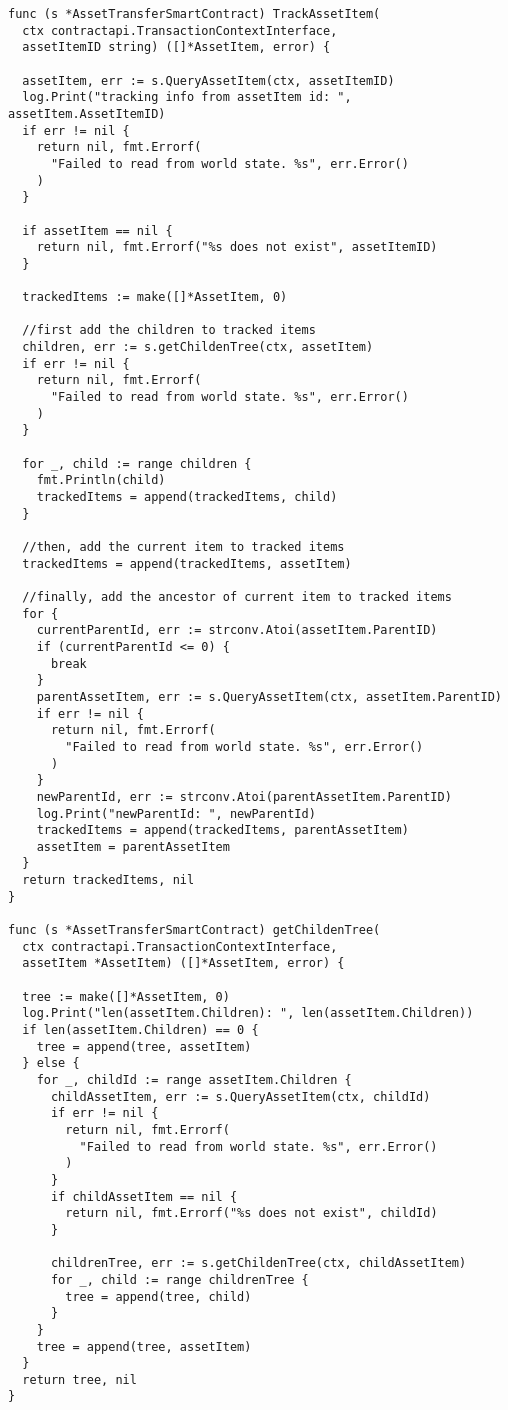 \begin{verbatim}
func (s *AssetTransferSmartContract) TrackAssetItem(
  ctx contractapi.TransactionContextInterface, 
  assetItemID string) ([]*AssetItem, error) {
  
  assetItem, err := s.QueryAssetItem(ctx, assetItemID)
  log.Print("tracking info from assetItem id: ", assetItem.AssetItemID)
  if err != nil {
    return nil, fmt.Errorf(
      "Failed to read from world state. %s", err.Error()
    )
  }

  if assetItem == nil {
    return nil, fmt.Errorf("%s does not exist", assetItemID)
  }

  trackedItems := make([]*AssetItem, 0)

  //first add the children to tracked items
  children, err := s.getChildenTree(ctx, assetItem)
  if err != nil {
    return nil, fmt.Errorf(
      "Failed to read from world state. %s", err.Error()
    )
  }

  for _, child := range children {
    fmt.Println(child)
    trackedItems = append(trackedItems, child)
  }

  //then, add the current item to tracked items
  trackedItems = append(trackedItems, assetItem)

  //finally, add the ancestor of current item to tracked items
  for {
    currentParentId, err := strconv.Atoi(assetItem.ParentID)
    if (currentParentId <= 0) {
      break
    }
    parentAssetItem, err := s.QueryAssetItem(ctx, assetItem.ParentID)
    if err != nil {
      return nil, fmt.Errorf(
        "Failed to read from world state. %s", err.Error()
      )
    }
    newParentId, err := strconv.Atoi(parentAssetItem.ParentID)
    log.Print("newParentId: ", newParentId)
    trackedItems = append(trackedItems, parentAssetItem)
    assetItem = parentAssetItem
  }
  return trackedItems, nil
}

func (s *AssetTransferSmartContract) getChildenTree(
  ctx contractapi.TransactionContextInterface, 
  assetItem *AssetItem) ([]*AssetItem, error) {
  
  tree := make([]*AssetItem, 0)
  log.Print("len(assetItem.Children): ", len(assetItem.Children))
  if len(assetItem.Children) == 0 {
    tree = append(tree, assetItem)
  } else {
    for _, childId := range assetItem.Children {
      childAssetItem, err := s.QueryAssetItem(ctx, childId)
      if err != nil {
        return nil, fmt.Errorf(
          "Failed to read from world state. %s", err.Error()
        )
      }
      if childAssetItem == nil {
        return nil, fmt.Errorf("%s does not exist", childId)
      }

      childrenTree, err := s.getChildenTree(ctx, childAssetItem)
      for _, child := range childrenTree {
        tree = append(tree, child)
      }
    }
    tree = append(tree, assetItem)
  }
  return tree, nil
}
\end{verbatim}

